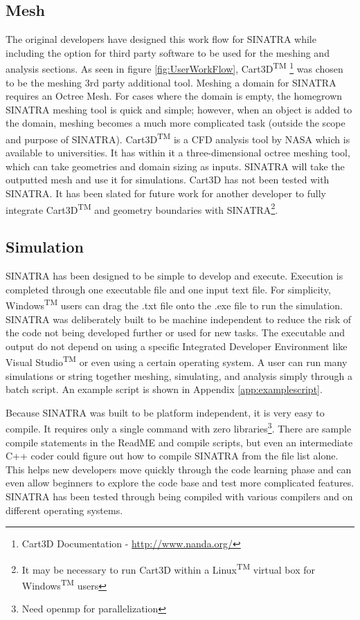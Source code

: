 \subsection{Mesh}
The original developers have designed this work flow for SINATRA while including the option for third party software to be used for the meshing and analysis sections. As seen in figure \ref{fig:UserWorkFlow}, Cart3D\textsuperscript{TM} \footnote{Cart3D Documentation - \url{http://www.nanda.org/}} was chosen to be the meshing 3rd party additional tool. Meshing a domain for SINATRA requires an Octree Mesh. For cases where the domain is empty, the homegrown SINATRA meshing tool is quick and simple; however, when an object is added to the domain, meshing becomes a much more complicated task (outside the scope and purpose of SINATRA).  Cart3D\textsuperscript{TM} is a CFD analysis tool by NASA which is available to universities. It has within it a three-dimensional octree meshing tool, which can take geometries and domain sizing as inputs. SINATRA will take the outputted mesh and use it for simulations. Cart3D has not been tested with SINATRA. It has been slated for future work for another developer to fully integrate Cart3D\textsuperscript{TM} and geometry boundaries with SINATRA\footnote{It may be necessary to run Cart3D within a Linux\textsuperscript{TM} virtual box for Windows\textsuperscript{TM} users}. \par

\subsection{Simulation}

SINATRA has been designed to be simple to develop and execute. Execution is completed through one executable file and one input text file. For simplicity, Windows\textsuperscript{TM} users can drag the .txt file onto the .exe file to run the simulation. SINATRA was deliberately built to be machine independent to reduce the risk of the code not being developed further or used for new tasks. The executable and output do not depend on using a specific Integrated Developer Environment like Visual Studio\textsuperscript{TM} or even using a certain operating system. A user can run many simulations or string together meshing, simulating, and analysis simply through a batch script. An example script is shown in Appendix \ref{app:examplescript}. \par
\indent Because SINATRA was built to be platform independent, it is very easy to compile. It requires only a single command with zero libraries\footnote{Need openmp for parallelization}. There are sample compile statements in the ReadME and compile scripts, but even an intermediate C++ coder could figure out how to compile SINATRA from the file list alone. This helps new developers move quickly through the code learning phase and can even allow beginners to explore the code base and test more complicated features. SINATRA has been tested through being compiled with various compilers and on different operating systems.

